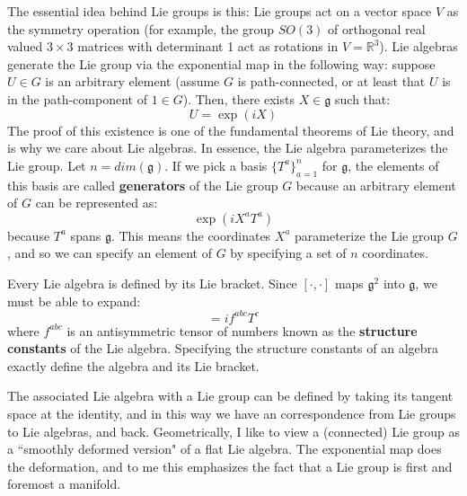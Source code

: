 \documentclass[11pt, oneside]{article}   	%
\theoremstyle{definition}
\begin{document}
The essential idea behind Lie groups is this: Lie groups act on a vector space $V$ as the symmetry 
operation (for example, the group $SO(3)$ of orthogonal real valued $3\times 3$ matrices with 
determinant 1 act as rotations in $V = \mathbb R^3$). Lie algebras generate the Lie group via the 
exponential map in the following way: suppose $U\in G$ 
is an arbitrary element (assume $G$ is path-connected, or at least that $U$ is in the path-component 
of $1\in G$). Then, there exists $X\in\mathfrak g$ such that:
\begin{equation}
	U = \exp(iX)
\end{equation}
The proof of this existence is one of the fundamental theorems of Lie theory, and is why we care 
about Lie algebras. In essence, the Lie algebra parameterizes the Lie group. Let $n = dim(\mathfrak 
g)$. If we pick a basis 
$\{T^a\}_{a = 1}^n$ for $\mathfrak g$, the elements of this basis are called \textbf{generators} of the 
Lie group $G$ because an arbitrary element of $G$ can be represented as:
\begin{equation}
	\exp(i X^a T^a)
\end{equation}
because $T^a$ spans $\mathfrak g$. This means the coordinates $X^a$ parameterize the Lie 
group $G$, and so we can specify an element of $G$ by specifying a set of $n$ coordinates. 

Every Lie algebra is defined by its Lie bracket. Since $[\cdot, \cdot]$ maps $\mathfrak g^2$ into 
$\mathfrak g$, we must be able to expand:
\begin{equation}
	[T^a, T^b] = if^{abc}T^c
\end{equation}
where $f^{abc}$ is an antisymmetric tensor of numbers known as the \textbf{structure constants} 
of the Lie algebra. Specifying the structure constants of an algebra exactly define the algebra and 
its Lie bracket. 

The associated Lie algebra with a Lie group can be defined by taking its tangent space at the 
identity, and in this way we have an correspondence from Lie groups to Lie algebras, and back. 
Geometrically, I like to view a (connected) Lie group as a ``smoothly deformed version" of a flat Lie algebra. 
The exponential map does the deformation, and to me this emphasizes the fact that a Lie group is 
first and foremost a manifold. 
\end{document}
